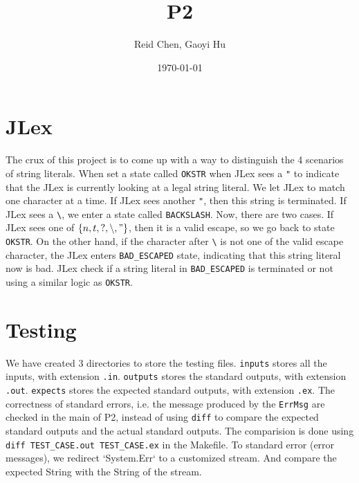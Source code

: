 \documentclass[11pt]{article}
\author{Reid Chen, Gaoyi Hu}
\date{\today}
\title{P2}
\begin{document}
\maketitle
\tableofcontents


\section{JLex}
\label{sec:org253db41}
The crux of this project is to come up with a way to distinguish the 4 scenarios of
string literals. When set a state called \texttt{OKSTR} when JLex sees a \texttt{"} to indicate that the JLex is
currently looking at a legal string literal. We let JLex to match one
character at a time. If JLex sees another \texttt{"}, then this string is
terminated. If JLex sees a \texttt{\textbackslash{}}, we enter a state called \texttt{BACKSLASH}. Now,
there are two cases. If JLex sees one of \(\{n, t, ?, \backslash, "\}\), then it is a
valid escape, so we go back to state \texttt{OKSTR}. On the other hand, if the
character after \texttt{\textbackslash{}} is not one of the valid escape character, the JLex enters
\texttt{BAD\_ESCAPED} state, indicating that this string literal now is bad. JLex
check if a string literal in \texttt{BAD\_ESCAPED} is terminated or not using a
similar logic as \texttt{OKSTR}.
\section{Testing}
\label{sec:orgaeb6be1}
We have created 3 directories to store the testing files. \texttt{inputs} stores all
the inputs, with extension \texttt{.in}. \texttt{outputs} stores the standard outputs, with
extension \texttt{.out}. \texttt{expects} stores the
expected standard outputs, with extension \texttt{.ex}. The correctness of standard errors, i.e. the
message produced by the \texttt{ErrMsg} are checked in the main of P2, instead of
using \texttt{diff} to compare the expected standard outputs and the actual standard outputs.
The comparision is done using \texttt{diff TEST\_CASE.out TEST\_CASE.ex} in the Makefile.
To standard error (error messages), we redirect `System.Err` to a customized
stream. And compare the expected String with the String of the stream.
\end{document}
